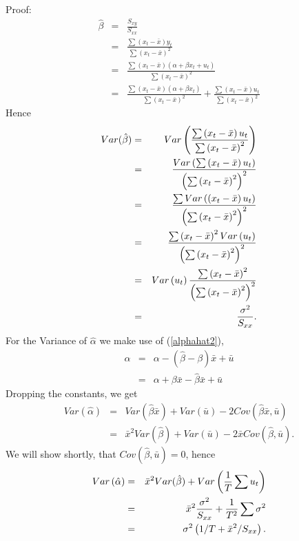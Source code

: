 \documentclass{article}
\begin{document}
Proof:
\begin{eqnarray*}
\hat{\beta} &=&\frac{S_{xy}}{S_{xx}} \\
&=&\frac{\sum \left( x_{t}-\bar{x}\right) y_{t}}{\sum \left( x_{t}-\bar{x}%
\right) ^{2}} \\
&=&\frac{\sum \left( x_{t}-\bar{x}\right) \left( \alpha +\beta
x_{t}+u_{t}\right) }{\sum \left( x_{t}-\bar{x}\right) ^{2}} \\
&=&\frac{\sum \left( x_{t}-\bar{x}\right) \left( \alpha +\beta x_{t}\right) 
}{\sum \left( x_{t}-\bar{x}\right) ^{2}}+\frac{\sum \left( x_{t}-\bar{x}%
\right) u_{t}}{\sum \left( x_{t}-\bar{x}\right) ^{2}}
\end{eqnarray*}%
Hence
\begin{eqnarray*}
Var( \hat{\beta}) &=&Var\left( \frac{\sum \left( x_{t}-\bar{x}%
\right) u_{t}}{\sum \left( x_{t}-\bar{x}\right) ^{2}}\right) \\
&=&\frac{Var\left( \sum \left( x_{t}-\bar{x}\right) u_{t}\right) }{\left(
\sum \left( x_{t}-\bar{x}\right) ^{2}\right) ^{2}} \\
&=&\frac{\sum Var\left( \left( x_{t}-\bar{x}\right) u_{t}\right) }{\left(
\sum \left( x_{t}-\bar{x}\right) ^{2}\right) ^{2}} \\
&=&\frac{\sum \left( x_{t}-\bar{x}\right) ^{2}Var\left( u_{t}\right) }{%
\left( \sum \left( x_{t}-\bar{x}\right) ^{2}\right) ^{2}} \\
&=&Var\left( u_{t}\right) \frac{\sum \left( x_{t}-\bar{x}\right) ^{2}}{%
\left( \sum \left( x_{t}-\bar{x}\right) ^{2}\right) ^{2}} \\
&=&\frac{\sigma ^{2}}{S_{xx}}.
\end{eqnarray*}%
For the Variance of $\hat{\alpha}$ we make use of (\ref{alphahat2}), 
\begin{eqnarray*}
\hat{\alpha} &=&\alpha -( \hat{\beta}-\beta ) \bar{x}+\bar{u} \\
&=&\alpha +\beta \bar{x}-\hat{\beta}\bar{x}+\bar{u}
\end{eqnarray*}%
Dropping the constants, we get
\begin{eqnarray*}
Var\left( \hat{\alpha}\right) &=&Var(\hat{\beta}\bar{x})+Var(\bar{u})-2Cov(%
\hat{\beta}\bar{x},\bar{u}) \\
&=&\bar{x}^{2}Var(\hat{\beta})+Var(\bar{u})-2\bar{x}Cov(\hat{\beta},\bar{u}).
\end{eqnarray*}%
We will show shortly, that $Cov(\hat{\beta},\bar{u})=0$, hence
\begin{eqnarray*}
Var\left( \hat{\alpha}\right) &=&\bar{x}^{2}Var(\hat{\beta})+Var\left( \frac{%
1}{T}\sum u_{t}\right) \\
&=&\bar{x}^{2}\frac{\sigma ^{2}}{S_{xx}}+\frac{1}{T^{2}}\sum \sigma ^{2} \\
&=&\sigma ^{2}\left( 1/T+\bar{x}^{2}/S_{xx}\right) .
\end{eqnarray*}%
\end{document}
